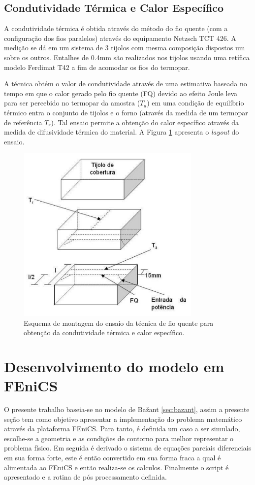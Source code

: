     \subsection{Condutividade Térmica e Calor Específico}\label{mat:condutividade}
    A condutividade térmica é obtida através do método do fio quente (com a
    configuração dos fios paralelos) através do
    equipamento Netzsch TCT 426. A medição se dá em um sistema de 3 tijolos com
    mesma composição dispostos um sobre os outros. Entalhes de 0.4mm são
    realizados nos tijolos usando uma retífica modelo Ferdimat T42 a fim de
    acomodar os fios do termopar.

    A técnica obtém o valor de condutividade através de uma estimativa baseada
    no tempo em que o calor gerado pelo fio quente (FQ) devido ao efeito Joule leva
    para ser percebido no termopar da amostra ($T_a$) em uma condição de equilíbrio
    térmico entra o conjunto de tijolos e o forno (através da medida de um
    termopar de referência $T_r$). Tal ensaio permite a obtenção do calor
    específico através da medida de difusividade térmica do material. A Figura \ref{fig:fio_quente}
    apresenta o {\it layout} do ensaio.

  \begin{figure}[ht]
	\centering
	\includegraphics[width=9cm]{./figures/fio_quente.pdf}
	\caption{Esquema de montagem do ensaio da técnica de fio quente para obtenção
    da condutividade térmica e calor específico.  \label{fig:fio_quente}}
  \end{figure}


\section{Desenvolvimento do modelo em FEniCS}\label{mat:fenics}
     O presente trabalho baseia-se no modelo de Ba\v{z}ant
     \ref{sec:bazant}, assim a presente seção tem como objetivo apresentar a implementação
     do problema matemático através da plataforma FEniCS. Para tanto, é definida um caso a ser
     simulado, escolhe-se a geometria e as condições de contorno para melhor
     representar o problema físico. Em seguida é derivado o sistema de equações
     parciais diferenciais em sua forma forte, este é então convertido em sua forma
     fraca a qual é alimentada ao FEniCS e então realiza-se os calculos. Finalmente o script é
     apresentado e a rotina de pós processamento definida.


